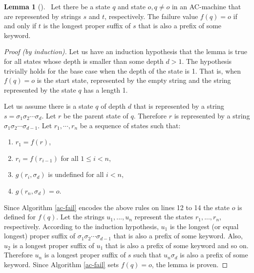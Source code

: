 \documentclass[english,twoside,censored,csm,algorithms-track-2020]{HYthesisML}
\theoremstyle{plain}
\theoremstyle{definition}
\newtheorem{lemma}[theorem]{Lemma}
\begin{document}
\begin{lemma}[]~\label{lem-overlap}
  Let there be a state $q$ and state $o, q\neq o$ in an AC-machine that are represented by strings
  $s$ and $t$, respectively. The failure value $f(q) = o$ if and only if $t$ is the longest proper suffix
  of $s$ that is also a prefix of some keyword.
\end{lemma}
\begin{proof}[Proof (by induction)]
  Let us have an induction hypothesis that the lemma is true for all states whose depth is smaller
  than some depth $d > 1$. The hypothesis trivially holds for the base case when the
  depth of the state is 1. That is, when $f(q) = o$ is the start state, represented by the empty
  string and the string represented by the state $q$ has a length 1.
  
  Let us assume there is a state $q$ of depth $d$ that is represented by a string
  $s=\sigma_1\sigma_2\cdots \sigma_d$. Let $r$ be the parent state of $q$. Therefore $r$ is represented by a
  string $\sigma_1\sigma_2\cdots \sigma_{d-1}$. Let $r_1,\cdots ,r_n$ be a sequence of states such that:

  \begin{enumerate}[leftmargin=28pt]
  \item $r_1 = f(r)$,
  \item $r_i = f(r_{i-1})$ for all $ 1 \leq i < n$,
  \item $g(r_i, \sigma_d)$ is undefined for all $i < n$,
  \item $g(r_n, \sigma_d) = o$.
  \end{enumerate}

  Since Algorithm \ref{ac-fail} encodes the above rules on lines 12 to 14 the state $o$ is defined
  for $f(q)$. Let the strings $u_1,...,u_n$ represent the states $r_1,...,r_n$, respectively.
  According to the induction hypothesis, $u_1$ is the longest (or equal longest) proper suffix of $\sigma_1\sigma_2\cdots \sigma_{d-1}$
  that is also a prefix of some keyword. Also, $u_2$ is a longest proper suffix of $u_1$ that is also
  a prefix of some keyword and so on. Therefore $u_n$ is a longest proper suffix of $s$ such that
  $u_n\sigma_d$ is also a prefix of some keyword. Since Algorithm \ref{ac-fail} sets $f(q) = o$,
  the lemma is proven.

\end{proof}  
\end{document}
